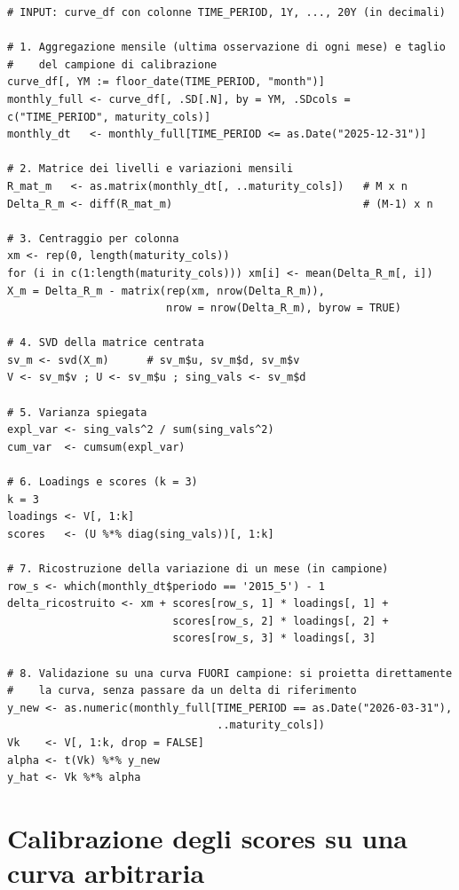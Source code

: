 \documentclass[11pt,a4paper]{article}
\theoremstyle{plain}
\theoremstyle{definition}
\theoremstyle{remark}
\begin{document}
\begin{algobox}
\begin{Verbatim}[fontsize=\small]
# INPUT: curve_df con colonne TIME_PERIOD, 1Y, ..., 20Y (in decimali)

# 1. Aggregazione mensile (ultima osservazione di ogni mese) e taglio
#    del campione di calibrazione
curve_df[, YM := floor_date(TIME_PERIOD, "month")]
monthly_full <- curve_df[, .SD[.N], by = YM, .SDcols = c("TIME_PERIOD", maturity_cols)]
monthly_dt   <- monthly_full[TIME_PERIOD <= as.Date("2025-12-31")]

# 2. Matrice dei livelli e variazioni mensili
R_mat_m   <- as.matrix(monthly_dt[, ..maturity_cols])   # M x n
Delta_R_m <- diff(R_mat_m)                              # (M-1) x n

# 3. Centraggio per colonna
xm <- rep(0, length(maturity_cols))
for (i in c(1:length(maturity_cols))) xm[i] <- mean(Delta_R_m[, i])
X_m = Delta_R_m - matrix(rep(xm, nrow(Delta_R_m)),
                         nrow = nrow(Delta_R_m), byrow = TRUE)

# 4. SVD della matrice centrata
sv_m <- svd(X_m)      # sv_m$u, sv_m$d, sv_m$v
V <- sv_m$v ; U <- sv_m$u ; sing_vals <- sv_m$d

# 5. Varianza spiegata
expl_var <- sing_vals^2 / sum(sing_vals^2)
cum_var  <- cumsum(expl_var)

# 6. Loadings e scores (k = 3)
k = 3
loadings <- V[, 1:k]
scores   <- (U %*% diag(sing_vals))[, 1:k]

# 7. Ricostruzione della variazione di un mese (in campione)
row_s <- which(monthly_dt$periodo == '2015_5') - 1
delta_ricostruito <- xm + scores[row_s, 1] * loadings[, 1] +
                          scores[row_s, 2] * loadings[, 2] +
                          scores[row_s, 3] * loadings[, 3]

# 8. Validazione su una curva FUORI campione: si proietta direttamente
#    la curva, senza passare da un delta di riferimento
y_new <- as.numeric(monthly_full[TIME_PERIOD == as.Date("2026-03-31"),
                                 ..maturity_cols])
Vk    <- V[, 1:k, drop = FALSE]
alpha <- t(Vk) %*% y_new
y_hat <- Vk %*% alpha
\end{Verbatim}
\end{algobox}


\section{Calibrazione degli scores su una curva arbitraria}
\label{sec:calibrazione}
\end{document}

